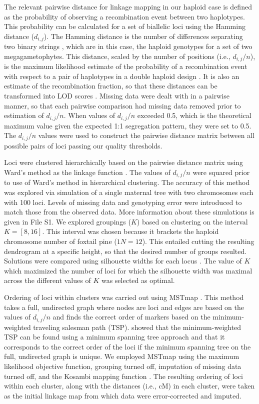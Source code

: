 \documentclass[11pt]{article}
\begin{document}
The relevant pairwise distance for linkage mapping in our haploid case is defined as the probability 
of observing a recombination event between two haplotypes. This probability can be calculated for a set of 
biallelic loci using the Hamming distance ($d_{i,j}$).
The Hamming distance is the number of differences separating two binary strings \citep{Hamming:1950}, which are 
in this case, the haploid genotypes for a set of two megagametophytes. 
This distance, scaled by the number of positions (i.e., $d_{i,j}/n$), 
is the maximum likelihood estimate of the probability of a recombination event with respect to a pair of haplotypes 
in a double haploid design \citep{Wu:2008a}. It is also an estimate of the recombination fraction, so that these distances can be transformed into LOD 
scores \citep[see][]{Morton:1955}. Missing data were dealt with in a pairwise manner, so that each pairwise comparison had 
missing data removed prior to estimation of $d_{i,j}/n$. When values of $d_{i,j}/n$ exceeded 0.5, which is the theoretical maximum 
value given the expected 1:1 segregation pattern, they were set to 0.5.  The $d_{i,j}/n$ values were used to construct the 
pairwise distance matrix between all possible pairs of loci passing our quality thresholds.

Loci were clustered hierarchically based on the pairwise distance matrix using Ward's method as the linkage function \citep{Ward:1963}.
The values of $d_{i,j}/n$ were squared prior to use of Ward's method in hierarchical clustering.
The accuracy of this method was explored via simulation of a single maternal tree with two chromosomes each
with 100 loci. Levels of missing data and genotyping error were introduced to match those from the observed data.
More information about these simulations is given in File S1.
We explored groupings ($K$) based on clustering on the interval $K=[8,16]$. This interval was 
chosen because it brackets the haploid chromosome number of foxtail pine ($1N = 12$). This entailed 
cutting the resulting dendrogram at a specific height, so that the desired number of groups resulted. 
Solutions were compared using silhouette widths for each locus \citep{Rousseeuw:1987}. 
The value of $K$ which maximized the number of loci for which the silhouette width was maximal 
across the different values of $K$ was selected as optimal.

Ordering of loci within clusters was carried out using MSTmap \citep{Wu:2008a}. This method takes a full, undirected graph where 
nodes are loci and edges are based on the values of $d_{i,j}/n$ and finds the correct order of markers based on the minimum-weighted 
traveling salesman path (TSP). \citet{Wu:2008a} showed that the minimum-weighted TSP can be found using a minimum spanning tree approach 
and that it corresponds to the correct order of the loci if the minimum spanning tree on the full, undirected graph is unique. We 
employed MSTmap using the maximum likelihood objective function, grouping turned off, imputation of missing data turned off, and the 
Kosambi mapping function \citep{Kosambi:1944}. The resulting ordering of loci within each cluster, along with the distances (i.e., cM) 
in each cluster, were taken as the initial linkage map from which data were error-corrected and imputed.
 
\end{document}
